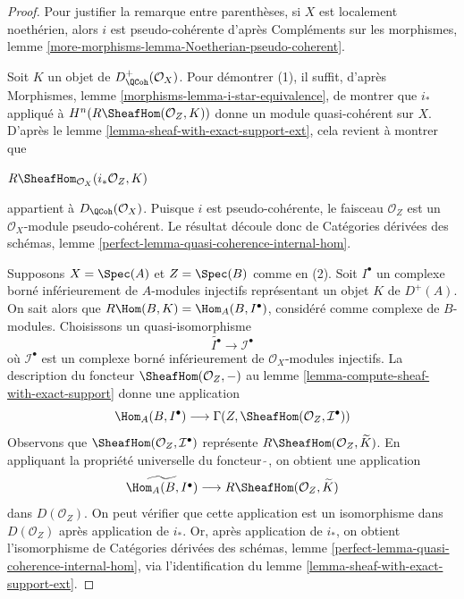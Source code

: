 \begin{proof}
Pour justifier la remarque entre parenthèses, si $X$ est localement noethérien, alors $i$ est pseudo-cohérente d'après Compléments sur les morphismes, lemme \ref{more-morphisms-lemma-Noetherian-pseudo-coherent}.

\medskip\noindent
Soit $K$ un objet de $D^+_\QCoh(\mathcal{O}_X)$. Pour démontrer (1), il suffit, d'après Morphismes, lemme \ref{morphisms-lemma-i-star-equivalence}, de montrer que $i_*$ appliqué à $H^n(R\SheafHom(\mathcal{O}_Z, K))$ donne un module quasi-cohérent sur $X$. D'après le lemme \ref{lemma-sheaf-with-exact-support-ext}, cela revient à montrer que
\par\noindent\hfil
$R\SheafHom_{\mathcal{O}_X}(i_*\mathcal{O}_Z, K)$
\hfil\par\noindent
appartient à $D_\QCoh(\mathcal{O}_X)$. Puisque $i$ est pseudo-cohérente, le faisceau $\mathcal{O}_Z$ est un $\mathcal{O}_X$-module pseudo-cohérent. Le résultat découle donc de Catégories dérivées des schémas, lemme \ref{perfect-lemma-quasi-coherence-internal-hom}.

\medskip\noindent
Supposons $X = \Spec(A)$ et $Z = \Spec(B)$ comme en (2). Soit $I^\bullet$ un complexe borné inférieurement de $A$-modules injectifs représentant un objet $K$ de $D^+(A)$. On sait alors que $R\Hom(B, K) = \Hom_A(B, I^\bullet)$, considéré comme complexe de $B$-modules. Choisissons un quasi-isomorphisme
$$
\widetilde{I^\bullet} \longrightarrow \mathcal{I}^\bullet
$$
où $\mathcal{I}^\bullet$ est un complexe borné inférieurement de $\mathcal{O}_X$-modules injectifs. La description du foncteur $\SheafHom(\mathcal{O}_Z, -)$ au lemme \ref{lemma-compute-sheaf-with-exact-support} donne une application
$$
\Hom_A(B, I^\bullet)
\longrightarrow
\Gamma(Z, \SheafHom(\mathcal{O}_Z, \mathcal{I}^\bullet))
$$
Observons que $\SheafHom(\mathcal{O}_Z, \mathcal{I}^\bullet)$ représente $R\SheafHom(\mathcal{O}_Z, \widetilde{K})$. En appliquant la propriété universelle du foncteur $\widetilde{\ }$, on obtient une application
$$
\widetilde{\Hom_A(B, I^\bullet)}
\longrightarrow
R\SheafHom(\mathcal{O}_Z, \widetilde{K})
$$
dans $D(\mathcal{O}_Z)$. On peut vérifier que cette application est un isomorphisme dans $D(\mathcal{O}_Z)$ après application de $i_*$. Or, après application de $i_*$, on obtient l'isomorphisme de Catégories dérivées des schémas, lemme \ref{perfect-lemma-quasi-coherence-internal-hom}, via l'identification du lemme \ref{lemma-sheaf-with-exact-support-ext}.
\end{proof}

